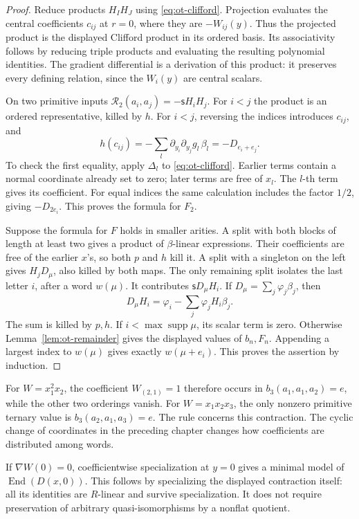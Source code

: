 \begin{proof}
Reduce products \(H_IH_J\) using \eqref{eq:ot-clifford}.
Projection evaluates the central coefficients \(c_{ij}\) at
\(r=0\), where they are \(-W_{ij}(y)\). Thus the projected
product is the displayed Clifford product in its ordered basis.
Its associativity follows by reducing triple products and
evaluating the resulting polynomial identities.
The gradient differential is a derivation of this product:
it preserves every defining relation, since the \(W_i(y)\)
are central scalars.

On two primitive inputs \(\mathcal R_2(a_i,a_j)=-\mathsf sH_iH_j\).
For \(i<j\) the product is an ordered representative, killed by \(h\).
For \(i<j\), reversing the indices introduces \(c_{ij}\), and
\[
 h(c_{ij})=-\sum_l\partial_{y_i}\partial_{y_j}g_l\,\beta_l
          =-D_{e_i+e_j}.
\]
To check the first equality, apply \(\Delta_l\) to
\eqref{eq:ot-clifford}. Earlier terms contain a normal coordinate
already set to zero; later terms are free of \(x_l\).
The \(l\)-th term gives its coefficient.
For equal indices the same calculation includes the factor
\(1/2\), giving \(-D_{2e_i}\). This proves the formula for \(F_2\).

Suppose the formula for \(F\) holds in smaller arities.
A split with both blocks of length at least two gives a product
of \(\beta\)-linear expressions. Their coefficients are free of
the earlier \(x\)'s, so both \(p\) and \(h\) kill it.
A split with a singleton on the left gives \(H_jD_\mu\),
also killed by both maps. The only remaining split isolates
the last letter \(i\), after a word \(w(\mu)\).
It contributes \(\mathsf sD_\mu H_i\). If
\(D_\mu=\sum_j\varphi_j\beta_j\), then
\[
 D_\mu H_i=\varphi_i-\sum_j\varphi_jH_i\beta_j.
\]
The sum is killed by \(p,h\). If
\(i<\max\operatorname{supp}\mu\), its scalar term is zero.
Otherwise Lemma~\ref{lem:ot-remainder} gives the displayed
values of \(b_n,F_n\).
Appending a largest index to \(w(\mu)\) gives exactly
\(w(\mu+e_i)\). This proves the assertion by induction.
\end{proof}

For \(W=x_1^2x_2\), the coefficient \(W_{(2,1)}=1\)
therefore occurs in \(b_3(a_1,a_1,a_2)=e\), while the
other two orderings vanish. For \(W=x_1x_2x_3\), the
only nonzero primitive ternary value is
\(b_3(a_2,a_1,a_3)=e\). The rule concerns this contraction.
The cyclic change of coordinates in the preceding chapter
changes how coefficients are distributed among words.

If \(\nabla W(0)=0\), coefficientwise specialization at \(y=0\)
gives a minimal model of \(\operatorname{End}(D(x,0))\).
This follows by specializing the displayed contraction itself:
all its identities are \(R\)-linear and survive specialization.
It does not require preservation of arbitrary quasi-isomorphisms
by a nonflat quotient.

